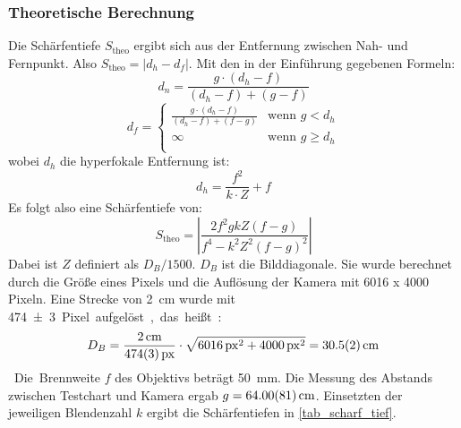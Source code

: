 \documentclass[
	a4paper,
	12pt,
	pagesize,
	ngerman
]{scrartcl}
\begin{document}
	\subsubsection*{Theoretische Berechnung}
	Die Schärfentiefe $S_\text{theo}$ ergibt sich aus der Entfernung zwischen Nah- und Fernpunkt.
	Also $S_\text{theo}= |d_h - d_f|$.
	Mit den in der Einführung gegebenen Formeln: %
	\begin{equation}
		d_n = \frac{g\cdot (d_h-f)}{(d_h-f)+(g-f)}
	\end{equation}
	\begin{equation}
		d_f = 
		\begin{cases}
			\frac{g\cdot (d_h - f)}{(d_h-f)+(f-g)} & \text{wenn }  g < d_h \\
			\infty & \text{wenn }  g \geq d_h \\
		\end{cases}
		\label{eq_fernpunkt}
	\end{equation}
	wobei $d_h$ die hyperfokale Entfernung ist:
	\begin{equation}
		d_h = \frac{f^2}{k\cdot Z} + f
	\end{equation}
	Es folgt also eine Schärfentiefe von:
	\begin{equation}
		S_\text{theo} = \left| \frac{2f^2 g k Z (f-g)}{f^4-k^2 Z^2 (f-g)^2} \right|
		\label{eq_scharf_tief}
	\end{equation}
	Dabei ist $Z$ definiert als $D_B/1500$. 
	$D_B$ ist die Bilddiagonale. 
	Sie wurde berechnet durch die Größe eines Pixels und die Auflösung der Kamera mit 6016 x 4000 Pixeln.
	Eine Strecke von \SI{2}{cm} wurde mit \SI{474+-3} Pixel aufgelöst, das heißt:
	\begin{equation}
		D_B = \frac{\SI{2}{cm}}{\SI{474+-3}{px}}\cdot \sqrt{\SI{6016}{px}^2+\SI{4000}{px}^2} = \SI{30,5+-0,2}{cm}
	\end{equation}
	Die Brennweite $f$ des Objektivs beträgt \SI{50}{mm}.
	Die Messung des Abstands zwischen Testchart und Kamera ergab $g=\SI{64+-0,81}{cm}$.
	Einsetzten der jeweiligen Blendenzahl $k$ ergibt die Schärfentiefen in \cref{tab_scharf_tief}.
\end{document}
